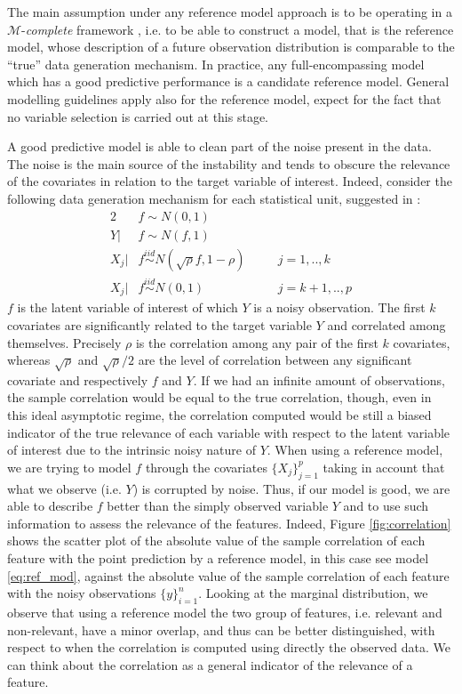 \documentclass[american,]{article}
\theoremstyle{definition}
\begin{document}
The main assumption under any reference model approach is to be operating in a $\mathcal{M}$-\textit{complete} framework \citep{book:bernardo_smith,paper:vehtari_ojanen}, i.e. to be able to construct a model, that is the reference model, whose description of a future observation distribution is comparable to the ``true'' data generation mechanism. In practice, any full-encompassing model which has a good predictive performance is a candidate reference model. General modelling guidelines apply also for the reference model, expect for the fact that no variable selection is carried out at this stage.
 
A good predictive model is able to clean part of the noise present in the data. The noise is the main source of the instability and tends to obscure the relevance of the covariates in relation to the target variable of interest. Indeed, consider the following data generation mechanism for each statistical unit, suggested in \cite{paper:projpred}:
\
\begin{alignat}{2} \label{eq:simulated_data}
     &f\sim N(0,1) && \nonumber \\ 
     Y|&f\sim N(f,1) && \\
     X_{j}|&f \overset{iid}{\sim} N(\sqrt{\rho}f,1-\rho) \quad &&j=1,..,k \nonumber \\
     X_{j}|&f \overset{iid}{\sim} N(0,1) &&j=k+1,..,p \nonumber
\end{alignat}
$f$ is the latent variable of interest of which $Y$ is a noisy observation. The first $k$ covariates are significantly related to the target variable $Y$ and correlated among themselves. Precisely $\rho$ is the correlation among any pair of the first $k$ covariates, whereas $\sqrt{\rho}$ and $\sqrt{\rho}/2$ are the level of correlation between any significant covariate and respectively $f$ and $Y$. If we had an infinite amount of observations, the sample correlation would be equal to the true correlation, though, even in this ideal asymptotic regime, the correlation computed would be still a biased indicator of the true relevance of each variable with respect to the latent variable of interest due to the intrinsic noisy nature of $Y$. When using a reference model, we are trying to model $f$ through the covariates $\{X_{j}\}_{j=1}^{p}$ taking in account that what we observe (i.e. $Y$) is corrupted by noise. Thus, if our model is good, we are able to describe $f$ better than the simply observed variable $Y$ and to use such information to assess the relevance of the features. Indeed, Figure \ref{fig:correlation} shows the scatter plot of the absolute value of the sample correlation of each feature with the point prediction by a reference model, in this case see model \eqref{eq:ref_mod}, against the absolute value of the sample correlation of each feature with the noisy observations $\{y\}_{i=1}^{n}$. Looking at the marginal distribution, we observe that using a reference model the two group of features, i.e. relevant and non-relevant, have a minor overlap, and thus can be better distinguished, with respect to when the correlation is computed using directly the observed data. We can think about the correlation as a general indicator of the relevance of a feature.  
\end{document}

